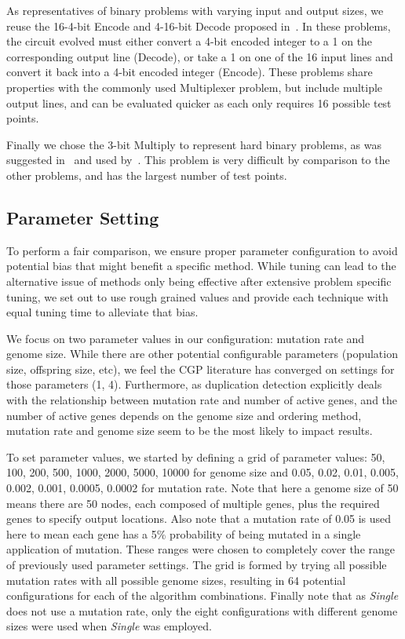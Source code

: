 \documentclass[journal]{IEEEtran}
\begin{document}
As representatives of binary problems with varying input and output sizes, we
reuse the 16-4-bit Encode and 4-16-bit Decode proposed in~\cite{goldman:2013:cgpwaste}.
In these problems, the circuit evolved must either convert a 4-bit encoded integer
to a 1 on the corresponding output line (Decode), or take a 1 on one of the 16
input lines and convert it back into a 4-bit encoded integer (Encode).  These
problems share properties with the commonly used Multiplexer problem, but include
multiple output lines, and can be evaluated quicker as each only requires 16 possible
test points.

Finally we chose the 3-bit Multiply to represent hard binary problems,
as was suggested in~\cite{white:2013:bgpb} and used
by~\cite{vassilev:2000:neutrality,miller:2006:redundancy,walker:2008:cgpmodules}.
This problem is very difficult by comparison to the other problems, and has
the largest number of test points.




\subsection{Parameter Setting}
\label{sec:parameter}
To perform a fair comparison, we ensure proper parameter configuration
to avoid potential bias that might benefit
a specific method.  While tuning can lead to the alternative issue
of methods only being effective after extensive problem specific tuning, we set out to use
rough grained values and provide each technique with equal tuning time to alleviate that bias.

We focus on two parameter values in our configuration: mutation rate and genome size.
While there are other potential configurable parameters (population size, offspring size, etc),
we feel the CGP literature has converged on settings for those parameters (1, 4).
Furthermore, as duplication detection explicitly deals with the relationship between
mutation rate and number of active genes, and the number of active genes depends
on the genome size and ordering method, mutation rate and genome size seem to be
the most likely to impact results.

To set parameter values, we started by defining a grid of parameter values:
50, 100, 200, 500, 1000, 2000, 5000, 10000 for genome size and 0.05, 0.02, 0.01,
0.005, 0.002, 0.001, 0.0005, 0.0002 for mutation rate.  Note that here a genome
size of 50 means there are 50 nodes, each composed of multiple genes, plus the
required genes to specify output locations.  Also note that a mutation rate of 0.05
is used here to mean each gene has a 5\% probability of being mutated in a single
application of mutation.  These ranges were chosen to completely cover the
range of previously used parameter settings.
The grid is formed by trying all possible mutation rates
with all possible genome sizes, resulting in 64 potential configurations for each
of the algorithm combinations.  Finally note that as \emph{Single} does not
use a mutation rate, only the eight configurations with different genome sizes were
used when \emph{Single} was employed.
\end{document}
